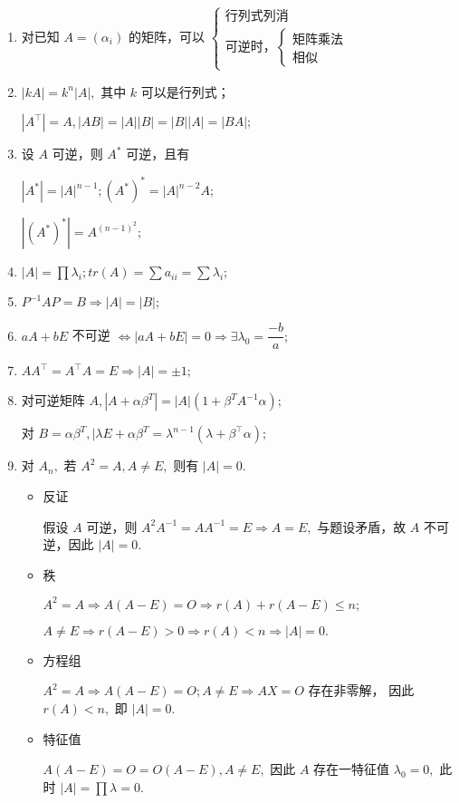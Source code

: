 \begin{enumerate}
    \item 对已知 $ A = (\alpha_i) $ 的矩阵，可以
    $ \begin{cases}
        \textrm{行列式列消}\\ \textrm{可逆时，}\begin{cases}
            \textrm{矩阵乘法}\\\textrm{相似}
        \end{cases}
    \end{cases} $ 
    \item $ |kA| = k^n|A|, $ 其中 $ k $ 可以是行列式；
    
    $ |A^\top|=A,|AB|=|A||B|=|B||A|=|BA|; $ 
    \item 设 $ A $ 可逆，则 $ A^* $ 可逆，且有

    $ |A^*| = |A|^{n-1};(A^*)^* = |A|^{n-2}A; $ 

    $ |(A^*)^*| = A^{(n-1)^2}; $ 
    \item $ |A| = \prod \lambda_i; tr(A) = \sum a_{ii} = \sum \lambda_i; $ 
    \item $ P^{-1}AP = B \Rightarrow |A| = |B|; $ 
    \item $ aA + bE $ 不可逆 $ \Leftrightarrow |aA + bE| = 0 \Rightarrow \exists \lambda_0 = \dfrac{-b}{a}; $ 
    \item $ AA^\top = A^\top A = E \Rightarrow |A| = \pm 1; $ 
    \item 对可逆矩阵 $ A, |A + \alpha\beta^T| = |A|(1+\beta^TA^{-1}\alpha); $ 
    
    对 $ B = \alpha\beta^T, |\lambda E + \alpha\beta^T = \lambda^{n-1}(\lambda + \beta^\top\alpha); $ 
    \item 对 $ A_n, $ 若 $ A^2 = A,A\neq E, $ 则有 $ |A| = 0. $ \begin{itemize}
        \item 反证
        
        假设 $ A $ 可逆，则 $ A^2A^{-1} = AA^{-1} = E \Rightarrow A = E, $ 与题设矛盾，故
        $ A $ 不可逆，因此 $ |A| = 0. $ 
        \item 秩
        
        $ A^2 = A \Rightarrow A(A-E) = O \Rightarrow r(A) + r(A-E) \leq n;$
        
        $ A\neq E \Rightarrow r(A-E)>0 \Rightarrow r(A) < n \Rightarrow |A| = 0. $ 
        \item 方程组
        
        $ A^2 = A \Rightarrow A(A-E) = O; A \neq E \Rightarrow AX = O $ 存在非零解，
        因此 $ r(A)<n, $ 即 $ |A|=0. $ 
        \item 特征值
        
        $ A(A-E) = O = O(A-E),A\neq E, $ 因此 $ A $ 存在一特征值 $ \lambda_0 = 0, $ 
        此时 $ |A| = \prod \lambda = 0. $ 
    \end{itemize}
\end{enumerate}

